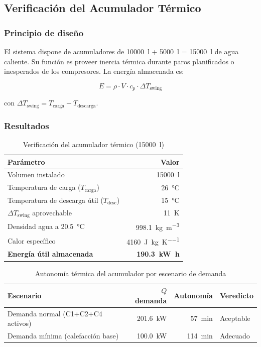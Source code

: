 \documentclass[11pt,a4paper]{article}
\begin{document}
\subsection{Verificación del Acumulador Térmico}

\subsubsection{Principio de diseño}

El sistema dispone de acumuladores de \SI{10000}{\litre} + \SI{5000}{\litre} = \SI{15000}{\litre}
de agua caliente. Su función es proveer inercia térmica durante paros planificados o
inesperados de los compresores. La energía almacenada es:

\begin{equation}
  E = \rho \cdot V \cdot c_p \cdot \Delta T_{\text{swing}}
  \label{eq:acum}
\end{equation}

con $\Delta T_{\text{swing}} = T_{\text{carga}} - T_{\text{descarga}}$.

\subsubsection{Resultados}

\begin{table}[h!]
\centering
\caption{Verificación del acumulador térmico (\SI{15000}{\litre})}
\label{tab:acumulador}
\begin{tabular}{@{}lr@{}}
\toprule
\textbf{Parámetro} & \textbf{Valor} \\
\midrule
Volumen instalado & \SI{15000}{\litre} \\
Temperatura de carga ($T_{\text{carga}}$) & \SI{26}{\celsius} \\
Temperatura de descarga útil ($T_{\text{desc}}$) & \SI{15}{\celsius} \\
$\Delta T_{\text{swing}}$ aprovechable & \SI{11}{\kelvin} \\
Densidad agua a \SI{20.5}{\celsius} & \SI{998.1}{\kilogram\per\cubic\metre} \\
Calor específico & \SI{4160}{\joule\per\kilogram\per\kelvin} \\
\textbf{Energía útil almacenada} & \textbf{\SI{190.3}{\kilo\watt\hour}} \\
\bottomrule
\end{tabular}
\end{table}

\begin{table}[h!]
\centering
\caption{Autonomía térmica del acumulador por escenario de demanda}
\label{tab:autonomia}
\begin{tabular}{@{}lrrl@{}}
\toprule
\textbf{Escenario} & \textbf{$Q$ demanda} & \textbf{Autonomía} & \textbf{Veredicto} \\
\midrule
Demanda normal (C1+C2+C4 activos) & \SI{201.6}{\kilo\watt} & \SI{57}{\minute} & Aceptable \\
Demanda mínima (calefacción base)  & \SI{100.0}{\kilo\watt} & \SI{114}{\minute} & Adecuado \\
\bottomrule
\end{tabular}
\end{table}
\end{document}
